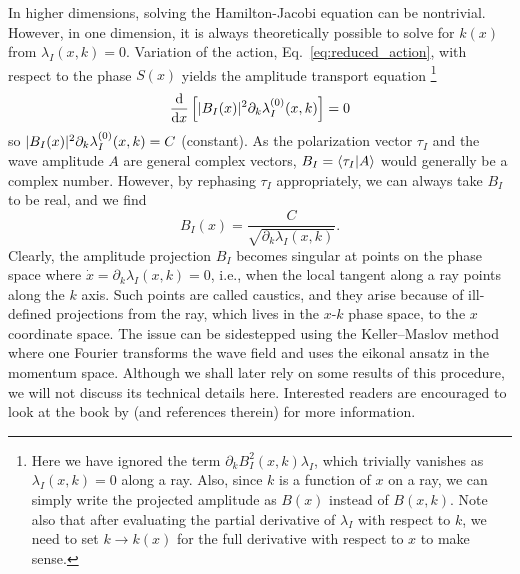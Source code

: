 In higher dimensions, solving the Hamilton-Jacobi equation can be nontrivial.
However, in one dimension, it is always theoretically possible to solve for $k(x)$ from $\lambda_{I}(x, k) = 0$.
Variation of the action, Eq.~\eqref{eq:reduced_action}, with respect to the phase $S(x)$ yields the amplitude transport equation%
\footnote{Here we have ignored the term $\partial_{k}{B_{I}^{2}(x,k)}\lambda_{I}$, which trivially vanishes as $\lambda_{I}(x, k) = 0$ along a ray.
Also, since $k$ is a function of $x$ on a ray, we can simply write the projected amplitude as $B(x)$ instead of $B(x,k)$.
Note also that after evaluating the partial derivative of $\lambda_{I}$ with respect to $k$, we need to set $k \to k(x)$ for the full derivative with respect to $x$ to make sense.}
%
\begin{equation}
\frac{\mathrm{d}}{\mathrm{d}{x}}\left[\lvert B_{I}(x)\rvert^{2}\partial_{k}\lambda^{(0)}_{I}(x, k)\right] = 0
\end{equation}
%
so
%
$\lvert B_{I}(x)\rvert^{2}\partial_{k}\lambda^{(0)}_{I}(x, k) = C$ (constant).
%
As the polarization vector $\tau_{I}$ and the wave amplitude $A$ are general complex vectors, $B_{I}=\mathinner{\langle{\tau_{I}|A}\rangle}$ would generally be a complex number.
However, by rephasing $\tau_{I}$ appropriately, we can always take $B_{I}$ to be
real, and we find
%
\begin{equation}
  B_{I}(x) = \frac{C}{\sqrt{\partial_{k}\lambda_{I}(x, k)}}.
\end{equation}
%
Clearly, the amplitude projection $B_{I}$ becomes singular at points on the phase space where $\dot{x} = \partial_{k}\lambda_{I}(x, k) = 0$, i.e., when the local tangent along a ray points along the $k$ axis.
Such points are called caustics, and they arise because of ill-defined projections from the ray, which lives in the $x$-$k$ phase space, to the $x$ coordinate space.
The issue can be sidestepped using the Keller--Maslov method~\cite{keller1958,maslov1981} where one Fourier transforms the wave field and uses the eikonal ansatz in the momentum space.
Although we shall later rely on some results of this procedure, we will not discuss its technical details here.
Interested readers are encouraged to look at the book by \citet[Chapter 6]{tracy2014} (and references therein) for more information.

